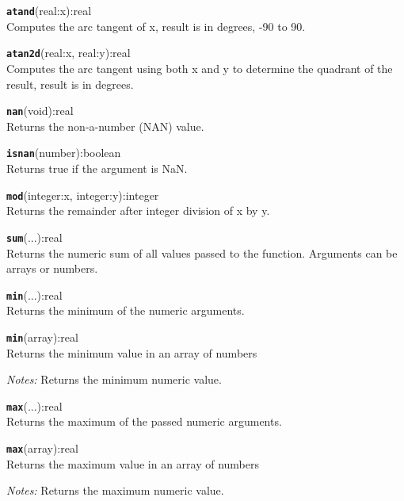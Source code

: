 \hrulefill

\texttt{{\large\textbf{atand}}}\textsf{(real:x):real}\\
 Computes the arc tangent of x, result is in degrees, -90 to 90.

\hrulefill

\texttt{{\large\textbf{atan2d}}}\textsf{(real:x, real:y):real}\\
 Computes the arc tangent using both x and y to determine the quadrant of the result, result is in degrees.

\hrulefill

\texttt{{\large\textbf{nan}}}\textsf{(void):real}\\
 Returns the non-a-number (NAN) value.

\hrulefill

\texttt{{\large\textbf{isnan}}}\textsf{(number):boolean}\\
 Returns true if the argument is NaN.

\hrulefill

\texttt{{\large\textbf{mod}}}\textsf{(integer:x, integer:y):integer}\\
 Returns the remainder after integer division of x by y.

\hrulefill

\texttt{{\large\textbf{sum}}}\textsf{(...):real}\\
 Returns the numeric sum of all values passed to the function. Arguments can be arrays or numbers.

\hrulefill

\texttt{{\large\textbf{min}}}\textsf{(...):real}\\
 Returns the minimum of the numeric arguments.

\texttt{{\large\textbf{min}}}\textsf{(array):real}\\
 Returns the minimum value in an array of numbers

\emph{Notes:} Returns the minimum numeric value.

\hrulefill

\texttt{{\large\textbf{max}}}\textsf{(...):real}\\
 Returns the maximum of the passed numeric arguments.

\texttt{{\large\textbf{max}}}\textsf{(array):real}\\
 Returns the maximum value in an array of numbers

\emph{Notes:} Returns the maximum numeric value.

\hrulefill

